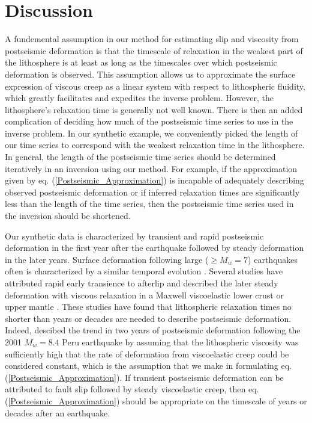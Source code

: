 \documentclass[extra]{gji}
\begin{document}
\section{Discussion}

A fundemental assumption in our method for estimating slip and
viscosity from postseismic deformation is that the timescale of
relaxation in the weakest part of the lithosphere is at least as long
as the timescales over which postseismic deformation is observed.
This assumption allows us to approximate the surface expression of
viscous creep as a linear system with respect to lithospheric
fluidity, which greatly facilitates and expedites the inverse problem.
However, the lithosphere's relaxation time is generally not well
known.  There is then an added complication of deciding how much of
the postseismic time series to use in the inverse problem.  In our
synthetic example, we conveniently picked the length of our time
series to correspond with the weakest relaxation time in the
lithosphere. In general, the length of the postseismic time series
should be determined iteratively in an inversion using our method.
For example, if the approximation given by
eq. (\ref{Postseismic_Approximation}) is incapable of adequately
describing observed postseismic deformation or if inferred relaxation
times are significantly less than the length of the time series, then
the postseismic time series used in the inversion should be shortened.

Our synthetic data is characterized by transient and rapid postseismic
deformation in the first year after the earthquake followed by steady
deformation in the later years.  Surface deformation following large
($\geq M_w=7$) earthquakes often is characterized by a similar
temporal evolution \citep[e.g.][]{SS1997,S2005,E2009}.  Several
studies have attributed rapid early transience to afterlip and
described the later steady deformation with viscous relaxation in a
Maxwell viscoelastic lower crust or upper mantle
\citep[e.g.][]{PA2005,J2009,H2009,F2006,R2015}.  These studies have
found that lithospheric relaxation times no shorter than years or
decades are needed to describe postseismic deformation.  Indeed,
\citet{PA2005} descibed the trend in two years of postseismic
deformation following the 2001 $M_w=8.4$ Peru earthquake by assuming
that the lithospheric viscosity was sufficiently high that the rate of
deformation from viscoelastic creep could be considered constant,
which is the assumption that we make in formulating
eq. (\ref{Postseismic_Approximation}). If transient postseismic
deformation can be attributed to fault slip followed by steady
viscoelastic creep, then eq. (\ref{Postseismic_Approximation}) should
be appropriate on the timescale of years or decades after an
earthquake.
\end{document}
